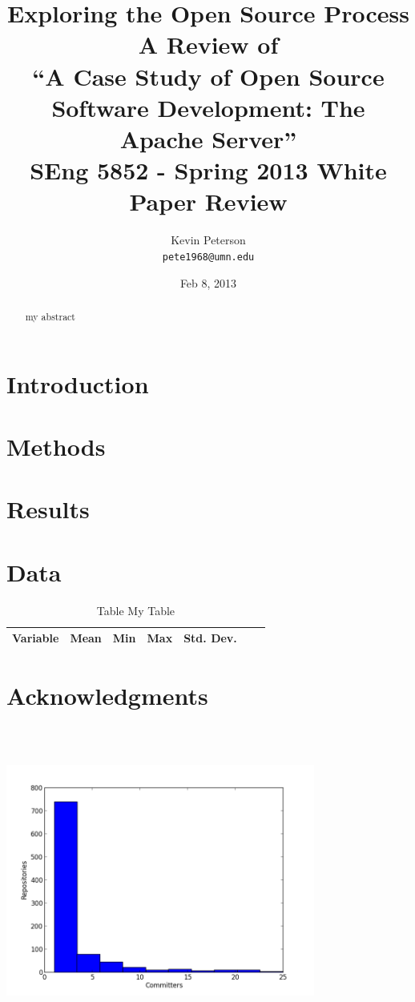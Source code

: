 \documentclass{article}
\title{
Exploring the Open Source Process
\\[2\baselineskip]
A Review of \\``A Case Study of Open Source Software Development: The Apache Server''
\\[2\baselineskip]
SEng 5852 - Spring 2013 White Paper Review
\\[2\baselineskip]
}
\author{Kevin Peterson\\
\small \texttt{pete1968@umn.edu}
}
\date{Feb 8, 2013}
\begin{document}
\maketitle


\begin{abstract}
my abstract
\end{abstract}

\section{Introduction}

\section{Methods}

\section{Results}

\section{Data}
\begin{table}
\caption{Table My Table}
\begin{center}
\begin{tabular}{rrrrrrr}
\hline
\hline
Variable & Mean & Min & Max & Std. Dev. \\ 
\hline

\hline
\end{tabular}
\end{center}
\end{table}

\section{Acknowledgments}

\includegraphics[height=4in,width=4in]{images/committers_histogram.png}
\end{document}
